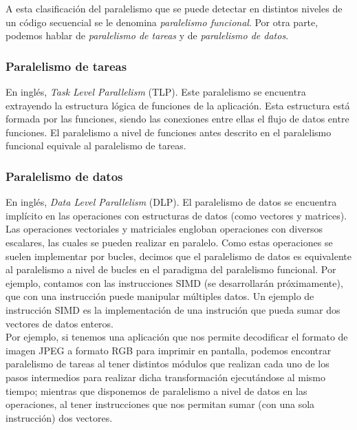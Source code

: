 A esta clasificación del paralelismo que se puede detectar en distintos niveles de un código secuencial se le denomina \emph{paralelismo funcional}. Por otra parte, podemos hablar de \emph{paralelismo de tareas} y de \emph{paralelismo de datos}.

\subsubsection{Paralelismo de tareas}
En inglés, \emph{Task Level Parallelism} (TLP). Este paralelismo se encuentra extrayendo la estructura lógica de funciones de la aplicación. Esta estructura está formada por las funciones, siendo las conexiones entre ellas el flujo de datos entre funciones. El paralelismo a nivel de funciones antes descrito en el paralelismo funcional equivale al paralelismo de tareas.

\subsubsection{Paralelismo de datos}
En inglés, \emph{Data Level Parallelism} (DLP). El paralelismo de datos se encuentra implícito en las operaciones con estructuras de datos (como vectores y matrices). Las operaciones vectoriales y matriciales engloban operaciones con diversos escalares, las cuales se pueden realizar en paralelo. Como estas operaciones se suelen implementar por bucles, decimos que el paralelismo de datos es equivalente al paralelismo a nivel de bucles en el paradigma del paralelismo funcional. Por ejemplo, contamos con las instrucciones SIMD (se desarrollarán próximamente), que con una instrucción puede manipular múltiples datos. Un ejemplo de instrucción SIMD es la implementación de una instrución que pueda sumar dos vectores de datos enteros.\\

Por ejemplo, si tenemos una aplicación que nos permite decodificar el formato de imagen JPEG a formato RGB para imprimir en pantalla, podemos encontrar paralelismo de tareas al tener distintos módulos que realizan cada uno de los pasos intermedios para realizar dicha transformación ejecutándose al mismo tiempo; mientras que disponemos de paralelismo a nivel de datos en las operaciones, al tener instrucciones que nos permitan sumar (con una sola instrucción) dos vectores.

